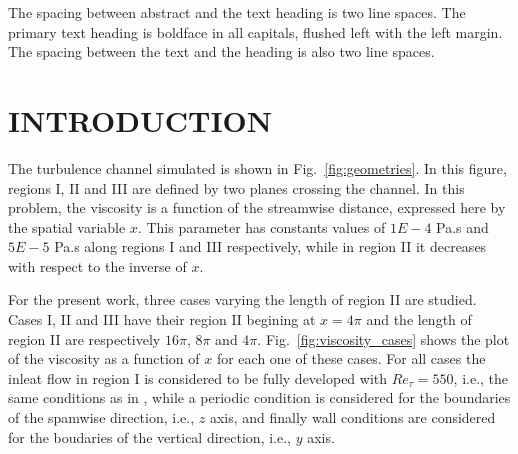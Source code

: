 \documentclass[twocolumn,10pt]{asme2e}
\begin{document}
\begin{nomenclature}
\end{nomenclature}

The spacing between abstract and the text heading is two line spaces.  The primary text heading is  boldface in all capitals, flushed left with the left margin.  The spacing between the  text and the heading is also two line spaces.

\section*{INTRODUCTION}

The turbulence channel simulated is shown in Fig.~\ref{fig:geometries}. In this figure, regions I, II and III are defined by two planes crossing the channel. In this problem, the viscosity is a function of the streamwise distance, expressed here by the spatial variable \(x\). This parameter has constants values of \(1E-4\) Pa.s and \(5E-5\) Pa.s along regions I and III respectively, while in region II it decreases with respect to the inverse of \(x\).

For the present work, three cases varying the length of region II are studied. Cases I, II and III have their region II begining at \(x=4\pi\) and the length of region II are respectively \(16\pi\), \(8\pi\) and \(4\pi\). Fig.~\ref{fig:viscosity_cases} shows the plot of the viscosity as a function of \(x\) for each one of these cases. For all cases the inleat flow in region I is considered to be fully developed with \(Re_{\tau}=550\), i.e., the same conditions as in \cite{hoyas2008}, while a periodic condition is considered for the boundaries of the spamwise direction, i.e., \(z\) axis, and finally wall conditions are considered for the boudaries of the vertical direction, i.e., \(y\) axis.
\end{document}
